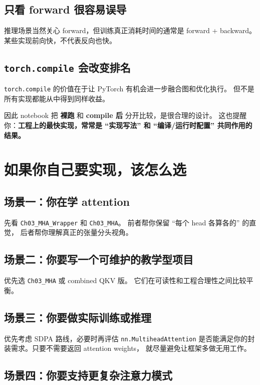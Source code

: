 \documentclass[12pt,a4paper]{ctexart}
\newcommand{\code}[1]{\texttt{#1}}
\begin{document}
\subsection{只看 forward 很容易误导}

推理场景当然关心 forward，但训练真正消耗时间的通常是
forward + backward。某些实现前向快，不代表反向也快。

\subsection{\code{torch.compile} 会改变排名}

\code{torch.compile} 的价值在于让 PyTorch 有机会进一步融合图和优化执行。
但不是所有实现都能从中得到同样收益。

因此 notebook 把
\textbf{裸跑} 和 \textbf{compile 后} 分开比较，是很合理的设计。
这也提醒你：\textbf{工程上的最快实现，常常是 ``实现写法'' 和
``编译/运行时配置'' 共同作用的结果。}

\section{如果你自己要实现，该怎么选}

\subsection{场景一：你在学 attention}

先看 \code{Ch03\_MHA\_Wrapper} 和 \code{Ch03\_MHA}。
前者帮你保留 ``每个 head 各算各的'' 的直觉，
后者帮你理解真正的张量分头视角。

\subsection{场景二：你要写一个可维护的教学型项目}

优先选 \code{Ch03\_MHA} 或 combined QKV 版。
它们在可读性和工程合理性之间比较平衡。

\subsection{场景三：你要做实际训练或推理}

优先考虑 SDPA 路线，必要时再评估 \code{nn.MultiheadAttention}
是否能满足你的封装需求。只要不需要返回 attention weights，
就尽量避免让框架多做无用工作。

\subsection{场景四：你要支持更复杂注意力模式}
\end{document}
